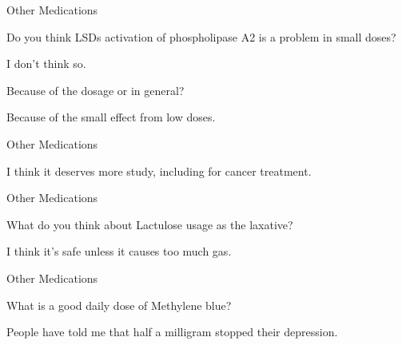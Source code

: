\documentclass[11pt,oneside,openany,extrafontsizes]{memoir}
\begin{document}
\begin{emailexchange}{Other Medications}

    \begin{question}
        Do you think LSDs activation of phospholipase A2 is a problem in small doses?
    \end{question}

    \begin{answer}
      I don't think so.
    \end{answer}

    \begin{question}
        Because of the dosage or in general? 
    \end{question}

    \begin{answer}
      Because of the small effect from low doses.
    \end{answer}
\end{emailexchange}

\begin{standalonequote}{Other Medications}

    \begin{answer}
      I think it deserves more study, including for cancer treatment.
    \end{answer}
\end{standalonequote}

\begin{qaexchange}{Other Medications}

    \begin{question}
        What do you think about Lactulose usage as the laxative? 
    \end{question}

    \begin{answer}
       I think it's safe unless it causes too much gas.
    \end{answer}
\end{qaexchange}

\begin{qaexchange}{Other Medications}

    \begin{question}
         What is a good daily dose of Methylene blue?
    \end{question}

    \begin{answer}
      People have told me that half a milligram stopped their depression.
    \end{answer}
\end{qaexchange}
\end{document}
